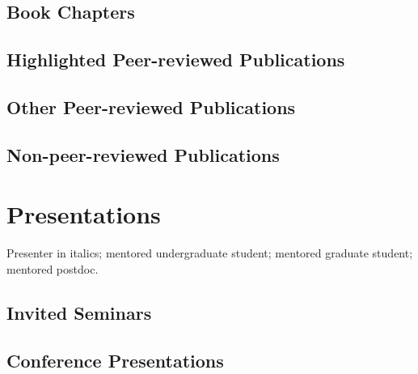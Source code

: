 
\subsection*{Book Chapters}
\nocite{*}
\printbibliography[filter=bookchapters, heading=none]

\subsection*{Highlighted Peer-reviewed Publications}
\nocite{*}
\printbibliography[filter=highlightedpapersnopreprints, heading=none]

\subsection*{Other Peer-reviewed Publications}
\nocite{*}
\printbibliography[filter=cvpapersnohighlightsnopreprints, heading=none]

\subsection*{Non-peer-reviewed Publications}


\section*{Presentations}
Presenter in italics;
\ugsymbol{}mentored undergraduate student;
\phdsymbol{}mentored graduate student;
\postdocsymbol{}mentored postdoc.

\subsection*{Invited Seminars}
\nocite{*}
\printbibliography[filter=invitedpresentation, heading=none]

\subsection*{Conference Presentations}
\nocite{*}
\printbibliography[filter=presentation, heading=none]


